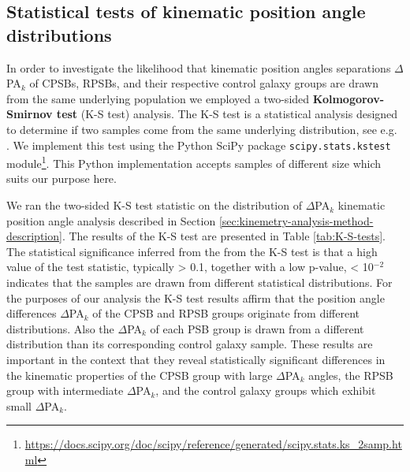 \subsection{Statistical tests of kinematic position angle distributions}
\label{sec:K-S-test}
In order to investigate the likelihood that kinematic position angles separations $\Delta$PA$_{k}$ of CPSBs, RPSBs, and their respective control galaxy groups are drawn from the same underlying population we employed a two-sided \textbf{Kolmogorov-Smirnov test} (K-S test) analysis. The K-S test is a statistical analysis designed to determine if two samples come from the same underlying distribution, see e.g. \citet{hodges1958significance}. We implement this test using the Python SciPy package \texttt{scipy.stats.kstest} module\footnote{\href{https://docs.scipy.org/doc/scipy/reference/generated/scipy.stats.ks\_2samp.html}{https://docs.scipy.org/doc/scipy/reference/generated/scipy.stats.ks\_2samp.html}}. This Python implementation accepts samples of different size which suits our purpose here.

We ran the two-sided K-S test statistic on the distribution of $\Delta$PA$_{k}$ kinematic position angle analysis described in Section \ref{sec:kinemetry-analysis-method-description}. The results of the K-S test are presented in Table \ref{tab:K-S-tests}. The statistical significance inferred from the from the K-S test is that a high value of the test statistic, typically > 0.1, together with a low p-value, < 10$^{-2}$ indicates that the samples are drawn from different statistical distributions. For the purposes of our analysis the K-S test results affirm that the position angle differences $\Delta$PA$_{k}$ of the CPSB and RPSB groups originate from different distributions. Also the $\Delta$PA$_{k}$ of each PSB group is drawn from a different distribution than its corresponding control galaxy sample. These results are important in the context that they reveal statistically significant differences in the kinematic properties of the CPSB group with large $\Delta$PA$_{k}$ angles, the RPSB group with intermediate $\Delta$PA$_{k}$, and the control galaxy groups which exhibit small $\Delta$PA$_{k}$. 

